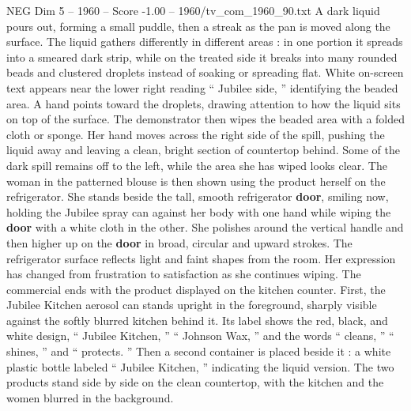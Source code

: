 \begin{textsample}{NEG Dim 5 – 1960 – Score -1.00 – 1960/tv\_com\_1960\_90.txt}
A dark liquid pours out, forming a small puddle, then a streak as the pan is moved along the surface.
The liquid gathers differently in different areas : in one portion it spreads into a smeared dark strip, while on the treated side it breaks into many rounded beads and clustered droplets instead of soaking or spreading flat.
White on-screen text appears near the lower right reading “ Jubilee side, ” identifying the beaded area.
A hand points toward the droplets, drawing attention to how the liquid sits on top of the surface.
The demonstrator then wipes the beaded area with a folded cloth or sponge.
Her hand moves across the right side of the spill, pushing the liquid away and leaving a clean, bright section of countertop behind.
Some of the dark spill remains off to the left, while the area she has wiped looks clear.
The woman in the patterned blouse is then shown using the product herself on the refrigerator.
She stands beside the tall, smooth refrigerator \textbf{door}, smiling now, holding the Jubilee spray can against her body with one hand while wiping the \textbf{door} with a white cloth in the other.
She polishes around the vertical handle and then higher up on the \textbf{door} in broad, circular and upward strokes.
The refrigerator surface reflects light and faint shapes from the room.
Her expression has changed from frustration to satisfaction as she continues wiping.
The commercial ends with the product displayed on the kitchen counter.
First, the Jubilee Kitchen aerosol can stands upright in the foreground, sharply visible against the softly blurred kitchen behind it.
Its label shows the red, black, and white design, “ Jubilee Kitchen, ” “ Johnson Wax, ” and the words “ cleans, ” “ shines, ” and “ protects. ” Then a second container is placed beside it : a white plastic bottle labeled “ Jubilee Kitchen, ” indicating the liquid version.
The two products stand side by side on the clean countertop, with the kitchen and the women blurred in the background.

\end{textsample}
